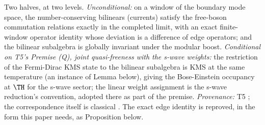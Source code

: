 Two halves, at two levels. \emph{Unconditional:} on a window of the boundary mode space, the number-conserving bilinears (currents) satisfy the free-boson commutation relations exactly in the completed limit, with an exact finite-window operator identity whose deviation is a difference of edge operators; and the bilinear subalgebra is globally invariant under the modular boost. \emph{Conditional on T5's Premise (Q), joint quasi-freeness with the s-wave weights:} the restriction of the Fermi-Dirac KMS state to the bilinear subalgebra is KMS at the same temperature (an instance of Lemma  below), giving the Bose-Einstein occupancy at $\TH$ for the s-wave sector; the linear weight assignment is the s-wave reduction's convention, adopted there as part of the premise. \emph{Provenance:} T5 \cite[Prem.~8.1, Thm.~8.2]{ButlerT5}; the correspondence itself is classical \cite{FrenkelKac1980}. The exact edge identity is reproved, in the form this paper needs, as Proposition  below.
